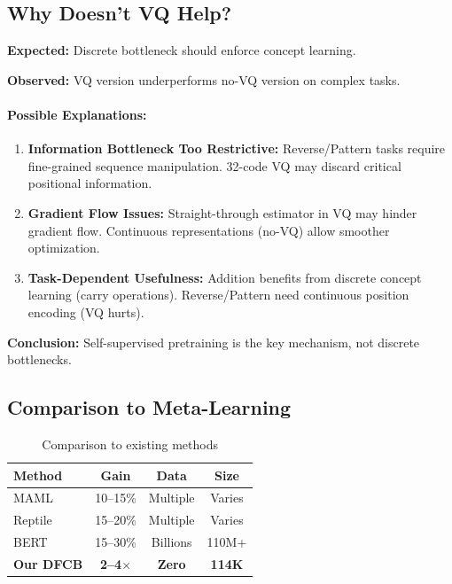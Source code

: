 \documentclass[11pt,twocolumn]{article}
\newcommand{\method}{DFCB}
\begin{document}
\subsection{Why Doesn't VQ Help?}

\textbf{Expected:} Discrete bottleneck should enforce concept learning.

\textbf{Observed:} VQ version underperforms no-VQ version on complex tasks.

\paragraph{Possible Explanations:}
\begin{enumerate}
    \item \textbf{Information Bottleneck Too Restrictive:} Reverse/Pattern tasks require fine-grained sequence manipulation. 32-code VQ may discard critical positional information.

    \item \textbf{Gradient Flow Issues:} Straight-through estimator in VQ may hinder gradient flow. Continuous representations (no-VQ) allow smoother optimization.

    \item \textbf{Task-Dependent Usefulness:} Addition benefits from discrete concept learning (carry operations). Reverse/Pattern need continuous position encoding (VQ hurts).
\end{enumerate}

\textbf{Conclusion:} Self-supervised pretraining is the key mechanism, not discrete bottlenecks.

\subsection{Comparison to Meta-Learning}

\begin{table}[h]
\centering
\caption{Comparison to existing methods}
\label{tab:comparison}
\begin{tabular}{lccc}
\toprule
Method & Gain & Data & Size \\
\midrule
MAML & 10--15\% & Multiple & Varies \\
Reptile & 15--20\% & Multiple & Varies \\
BERT & 15--30\% & Billions & 110M+ \\
\textbf{Our \method{}} & \textbf{2--4$\times$} & \textbf{Zero} & \textbf{114K} \\
\bottomrule
\end{tabular}
\end{table}
\end{document}

